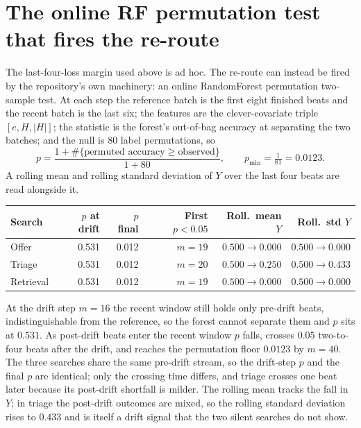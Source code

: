 \documentclass[11pt,a4paper]{article}
\begin{document}
\section{The online RF permutation test that fires the re-route}
The last-four-loss margin used above is ad hoc.
The re-route can instead be fired by the repository's own machinery: an online RandomForest permutation two-sample test.
At each step the reference batch is the first eight finished beats and the recent batch is the last six; the features are the clever-covariate triple \([e,H,|H|]\); the statistic is the forest's out-of-bag accuracy at separating the two batches; and the null is 80 label permutations, so
\[
p=\frac{1+\#\{\text{permuted accuracy}\ge\text{observed}\}}{1+80},
\qquad p_{\min}=\tfrac{1}{81}=0.0123 .
\]
A rolling mean and rolling standard deviation of \(Y\) over the last four beats are read alongside it.
\begin{center}
\begin{tabular}{lrrrrr}
\toprule
Search & \(p\) at drift & \(p\) final & First \(p<0.05\) & Roll.\ mean \(Y\) & Roll.\ std \(Y\) \\
\midrule
Offer     & 0.531 & 0.012 & \(m=19\) & \(0.500\to0.000\) & \(0.500\to0.000\) \\
Triage    & 0.531 & 0.012 & \(m=20\) & \(0.500\to0.250\) & \(0.500\to0.433\) \\
Retrieval & 0.531 & 0.012 & \(m=19\) & \(0.500\to0.000\) & \(0.500\to0.000\) \\
\bottomrule
\end{tabular}
\end{center}
At the drift step \(m=16\) the recent window still holds only pre-drift beats, indistinguishable from the reference, so the forest cannot separate them and \(p\) sits at \(0.531\).
As post-drift beats enter the recent window \(p\) falls, crosses \(0.05\) two-to-four beats after the drift, and reaches the permutation floor \(0.0123\) by \(m=40\).
The three searches share the same pre-drift stream, so the drift-step \(p\) and the final \(p\) are identical; only the crossing time differs, and triage crosses one beat later because its post-drift shortfall is milder.
The rolling mean tracks the fall in \(Y\); in triage the post-drift outcomes are mixed, so the rolling standard deviation rises to \(0.433\) and is itself a drift signal that the two silent searches do not show.
\end{document}
